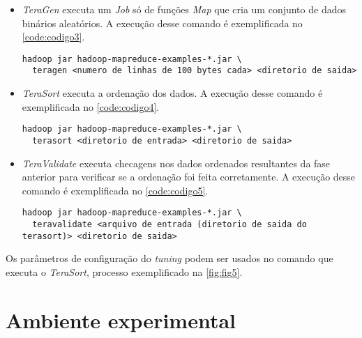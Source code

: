 \begin{itemize}
  \item \textit{TeraGen} executa um \textit{Job} só de funções \textit{Map} que cria um conjunto de dados binários aleatórios. A execução desse comando é exemplificada no \autoref{code:codigo3}.
  
  \begin{lstlisting}[caption={Exemplo de execução do \textit{TeraGen} adaptado de \cite{HadoopBook15}}, label=code:codigo3]
  hadoop jar hadoop-mapreduce-examples-*.jar \
  teragen <numero de linhas de 100 bytes cada> <diretorio de saida>
  \end{lstlisting}
  
  \item \textit{TeraSort} executa a ordenação dos dados. A execução desse comando é exemplificada no \autoref{code:codigo4}.
  \begin{lstlisting}[caption={Exemplo de execução do \textit{TeraSort} adaptado de \cite{HadoopBook15}}, label=code:codigo4]
  hadoop jar hadoop-mapreduce-examples-*.jar \
  terasort <diretorio de entrada> <diretorio de saida>
  \end{lstlisting}  

  \item \textit{TeraValidate} executa checagens nos dados ordenados resultantes da fase anterior para verificar se a ordenação foi feita corretamente. A execução desse comando é exemplificada no \autoref{code:codigo5}.
  \begin{lstlisting}[caption={Exemplo de execução do \textit{TeraValidate} adaptado de \cite{HadoopBook15}}, label=code:codigo5]
  hadoop jar hadoop-mapreduce-examples-*.jar \
  teravalidate <arquivo de entrada (diretorio de saida do terasort)> <diretorio de saida>
  \end{lstlisting}

\end{itemize}

Os parâmetros de configuração do \textit{tuning} podem ser usados no comando que executa o \textit{TeraSort}, processo exemplificado na \autoref{fig:fig5}.


\section{Ambiente experimental} \label{sec:ambienteexperimental}

